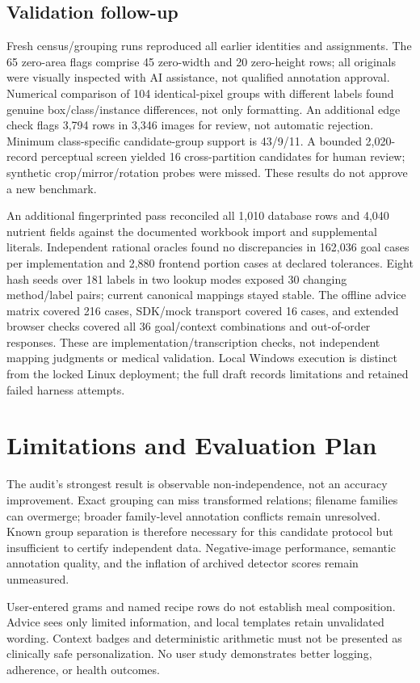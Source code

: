 \documentclass[conference]{IEEEtran}
\begin{document}
\subsection{Validation follow-up}
Fresh census/grouping runs reproduced all earlier identities and assignments. The 65 zero-area flags comprise 45 zero-width and 20 zero-height rows; all originals were visually inspected with AI assistance, not qualified annotation approval. Numerical comparison of 104 identical-pixel groups with different labels found genuine box/class/instance differences, not only formatting. An additional edge check flags 3,794 rows in 3,346 images for review, not automatic rejection. Minimum class-specific candidate-group support is 43/9/11. A bounded 2,020-record perceptual screen yielded 16 cross-partition candidates for human review; synthetic crop/mirror/rotation probes were missed. These results do not approve a new benchmark.

An additional fingerprinted pass reconciled all 1,010 database rows and 4,040 nutrient fields against the documented workbook import and supplemental literals. Independent rational oracles found no discrepancies in 162,036 goal cases per implementation and 2,880 frontend portion cases at declared tolerances. Eight hash seeds over 181 labels in two lookup modes exposed 30 changing method/label pairs; current canonical mappings stayed stable. The offline advice matrix covered 216 cases, SDK/mock transport covered 16 cases, and extended browser checks covered all 36 goal/context combinations and out-of-order responses. These are implementation/transcription checks, not independent mapping judgments or medical validation. Local Windows execution is distinct from the locked Linux deployment; the full draft records limitations and retained failed harness attempts.

\section{Limitations and Evaluation Plan}
The audit's strongest result is observable non-independence, not an accuracy improvement. Exact grouping can miss transformed relations; filename families can overmerge; broader family-level annotation conflicts remain unresolved. Known group separation is therefore necessary for this candidate protocol but insufficient to certify independent data. Negative-image performance, semantic annotation quality, and the inflation of archived detector scores remain unmeasured.

User-entered grams and named recipe rows do not establish meal composition. Advice sees only limited information, and local templates retain unvalidated wording. Context badges and deterministic arithmetic must not be presented as clinically safe personalization. No user study demonstrates better logging, adherence, or health outcomes.
\end{document}
